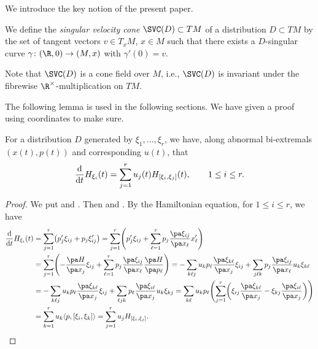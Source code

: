 We introduce the key notion of the present paper.

\begin{Definition}
We define the {\it singular velocity cone} $\SVC(D) \subset TM$ of a distribution ${D \subset TM}$ by
the set of tangent vectors $v \in T_xM$, $x \in M$ such that there exists a $D$-singular curve
$\gamma\colon (\R, 0) \to (M, x)$ with $\gamma'(0) = v$.
\end{Definition}

Note that $\SVC(D)$ is a cone field over $M$, i.e., $\SVC(D)$ is invariant under
the fibrewise $\R^\times$-multiplication on $TM$.

The following lemma is used in the following sections. We have given a proof using coordinates to make sure.

\begin{Lemma}
\label{Singular-curve-lemma} For a distribution $D$ generated by $\xi_1, \dots, \xi_r$,
we have, along abnormal bi-extremals $(x(t), p(t))$ and corresponding $u(t)$, that
\[
\frac{{\rm d}}{{\rm d}t}H_{\xi_i}(t) = \sum_{j=1}^r u_j(t) H_{[\xi_i, \xi_j]}(t), \qquad 1 \leq i \leq r.
\]
\end{Lemma}
\begin{proof}
We put  and .
Then  and .
By the Hamiltonian equation, for $1 \leq i \leq r$, we have
\begin{align*}
\frac{{\rm d}}{{\rm d}t}H_{\xi_i}(t) & = \sum_{j=1}^r \bigl(p_j'\xi_{ij} + p_j\xi_{ij}'\bigr) =
\sum_{j=1}^r \Biggl(p_j'\xi_{ij} + \sum_{\ell =1}^r p_j\frac{\pa \xi_{ij}}{\pa x_\ell}x_{\ell}'\Biggr)
\\
& = \sum_{j=1}^r \Biggl(- \frac{\pa H}{\pa x_j}\xi_{ij}
+ \sum_{\ell =1}^r p_j\frac{\pa \xi_{ij}}{\pa x_\ell}\frac{\pa H}{\pa p_\ell}\Biggr)
 = - \sum_{k\ell j} u_kp_\ell \frac{\pa \xi_{k\ell}}{\pa x_j}\xi_{ij}
+ \sum_{j\ell k} p_j\frac{\pa \xi_{ij}}{\pa x_\ell}u_k\xi_{k\ell}
\\
& =
 - \sum_{k\ell j} u_kp_\ell \frac{\pa \xi_{k\ell}}{\pa x_j}\xi_{ij}
+ \sum_{\ell j k} p_\ell\frac{\pa \xi_{i\ell}}{\pa x_j}u_k\xi_{kj}
=
\sum_{k\ell} u_kp_\ell\Biggl(
\sum_{j=1}^r\biggl(
\xi_{ij}\frac{\pa \xi_{k\ell}}{\pa x_j} - \xi_{kj}\frac{\pa \xi_{i\ell}}{\pa x_j}
\biggr)
\Biggr)
\\
& = \sum_{k=1}^r u_k\langle p, [\xi_i, \xi_k]\rangle = \sum_{j=1}^r u_jH_{[\xi_i, \xi_j]}.
\tag*{\qed}
\end{align*}
\renewcommand{\qed}{}
\end{proof}

